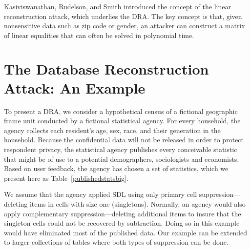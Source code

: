 \documentclass[runningheads]{llncs}
\newif\iflongversion
\begin{document}
Kasiviswanathan, Rudelson, and Smith\cite{Kasiviswanathan:2013:PLR:2627817.2627919} introduced
the concept of the linear reconstruction attack, which underlies the  DRA. The key concept is that,
given nonsensitive data such as zip code or gender, an attacker
can construct a matrix of linear equalities that can often be solved
in polynomial time. \iflongversion The paper also analyzes a common reconstruction
technique known as least squares decoding, where the attacker sets up
a goal function to minimize the square of the distance between two
databases in order to reconstruct the original database.\fi

\iflongversion
Brown and Heathers\cite{doi:10.1177/1948550616673876} developed the
granularity-related inconsistency of means (GRIM) test in response to
observed inconsistencies in published data from psychological
journals. This test is centered around the premise that, for
statistics drawn from integer data, only certain means are
possible. The GRIM test determines whether reported means could
possibly have come from data sets with a certain size, granularity,
and group number. In surveying 71 published articles, the authors
found 36 papers with one inconsistency and 16 with two or more
inconsistencies. Although this test was intended to detect possible
errors or mean falsification in published articles, the concept of
drawing inferential conclusions about a data set based only on 
published statistics is a key concept behind the DRA.
\fi

\section{The Database Reconstruction Attack: An Example}

To present a DRA, we consider a hypothetical
census of a fictional geographic frame unit conducted by a fictional statistical
agency. For every household, the agency collects each resident's age,
sex, race, and their generation in the household.  Because the
confidential data will not be released in order to protect respondent privacy, the statistical agency
publishes every conceivable statistic that might be of use to a
potential demographers, sociologists and economists. Based on user
feedback\iflongversion from previous census reports\fi, the agency has chosen 
a set of statistics, which we present here as Table~\ref{publishedstatsbig}.

We assume that the agency applied SDL using only primary cell suppression---deleting items
in cells with size one (singletons). Normally, an agency would also apply complementary 
suppression---deleting additional items to insure that the singleton cells
could not be recovered by subtraction\cite{Fellegi:1972}. Doing so in this
example would have eliminated most of the published data. Our example can be
extended to larger collections of tables where both types of suppression can 
be done.
\end{document}
